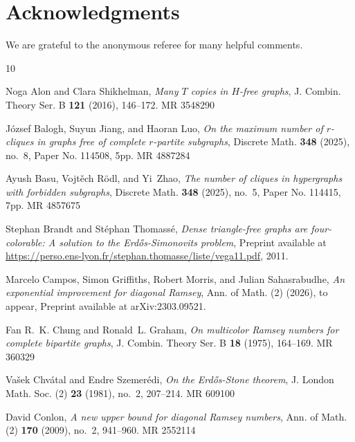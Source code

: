 \documentclass[11pt]{article}
\numberwithin{equation}{section}
\theoremstyle{plain}
\theoremstyle{remark}
\begin{document}
\section*{Acknowledgments} We are grateful to the anonymous referee for many helpful comments.
\providecommand{\bysame}{\leavevmode\hbox to3em{\hrulefill}\thinspace}
\providecommand{\MR}{\relax\ifhmode\unskip\space\fi MR }
\providecommand{\MRhref}[2]{%
  \href{http://www.ams.org/mathscinet-getitem?mr=#1}{#2}
}
\providecommand{\href}[2]{#2}
\begin{thebibliography}{10}

Noga Alon and Clara Shikhelman, \emph{Many {$T$} copies in {$H$}-free graphs},
  J. Combin. Theory Ser. B \textbf{121} (2016), 146--172. \MR{3548290}

J\'ozsef Balogh, Suyun Jiang, and Haoran Luo, \emph{On the maximum number of
  {$r$}-cliques in graphs free of complete {$r$}-partite subgraphs}, Discrete
  Math. \textbf{348} (2025), no.~8, Paper No. 114508, 5pp. \MR{4887284}

Ayush Basu, Vojt\v{e}ch R\"odl, and Yi~Zhao, \emph{The number of cliques in
  hypergraphs with forbidden subgraphs}, Discrete Math. \textbf{348} (2025),
  no.~5, Paper No. 114415, 7pp. \MR{4857675}

Stephan Brandt and St\'ephan Thomass\'e, \emph{Dense triangle-free graphs are
  four-colorable: {A} solution to the {Erd\H{o}s}-{S}imonovits problem},
  Preprint available at
  \url{https://perso.ens-lyon.fr/stephan.thomasse/liste/vega11.pdf}, 2011.

Marcelo Campos, Simon Griffiths, Robert Morris, and Julian Sahasrabudhe,
  \emph{An exponential improvement for diagonal {R}amsey}, Ann. of Math. (2)
  (2026), to appear, Preprint available at arXiv:2303.09521.

Fan R.~K. Chung and Ronald~L. Graham, \emph{On multicolor {R}amsey numbers for
  complete bipartite graphs}, J. Combin. Theory Ser. B \textbf{18} (1975),
  164--169. \MR{360329}

Va\v{s}ek Chv\'{a}tal and Endre Szemer\'{e}di, \emph{On the {Erd\H{o}s}-{S}tone
  theorem}, J. London Math. Soc. (2) \textbf{23} (1981), no.~2, 207--214.
  \MR{609100}

David Conlon, \emph{A new upper bound for diagonal {R}amsey numbers}, Ann. of
  Math. (2) \textbf{170} (2009), no.~2, 941--960. \MR{2552114}


\end{thebibliography}
\end{document}
